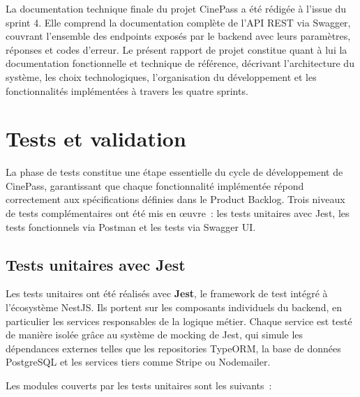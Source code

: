 \documentclass[12pt]{report}
\begin{document}
La documentation technique finale du projet CinePass a été rédigée à l'issue
du sprint 4. Elle comprend la documentation complète de l'API REST via
Swagger, couvrant l'ensemble des endpoints exposés par le backend avec leurs
paramètres, réponses et codes d'erreur. Le présent rapport de projet constitue
quant à lui la documentation fonctionnelle et technique de référence,
décrivant l'architecture du système, les choix technologiques, l'organisation
du développement et les fonctionnalités implémentées à travers les quatre
sprints.
\section{Tests et validation}

La phase de tests constitue une étape essentielle du cycle
de développement de CinePass, garantissant que chaque
fonctionnalité implémentée répond correctement aux
spécifications définies dans le Product Backlog. Trois
niveaux de tests complémentaires ont été mis en \oe{}uvre~:
les tests unitaires avec Jest, les tests fonctionnels via
Postman et les tests via Swagger UI.

\subsection{Tests unitaires avec Jest}

Les tests unitaires ont été réalisés avec \textbf{Jest},
le framework de test intégré à l'écosystème NestJS. Ils
portent sur les composants individuels du backend, en
particulier les services responsables de la logique métier.
Chaque service est testé de manière isolée grâce au système
de mocking de Jest, qui simule les dépendances externes
telles que les repositories TypeORM, la base de données
PostgreSQL et les services tiers comme Stripe ou Nodemailer.

Les modules couverts par les tests unitaires sont les
suivants~:
\end{document}
